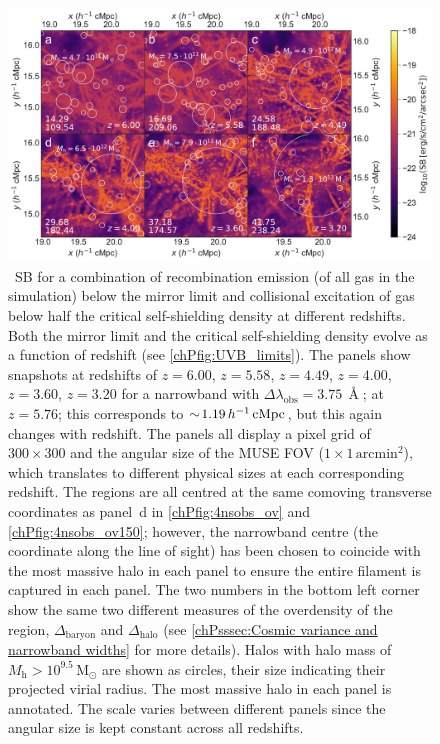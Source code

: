 \begin{figure}
    \centering
    \includegraphics[width=\linewidth]{"Plots/ChapterP/Redshift_SB_evolution"}
    \caption[Observed \lya\ surface brightness at different redshifts]
    {\lya\ SB for a combination of recombination emission (of all gas in the simulation) below the mirror limit and collisional excitation of gas below half the critical self-shielding density at different redshifts. Both the mirror limit and the critical self-shielding density evolve as a function of redshift (see \cref{chPfig:UVB_limits}). The panels show snapshots at redshifts of $z=6.00$, $z=5.58$, $z=4.49$, $z=4.00$, $z=3.60$, $z=3.20$ for a narrowband with $\Delta \lambda_\text{obs} = 3.75 \, \Angstrom$; at $z=5.76$; this corresponds to $\sim \! 1.19 \, h^{-1} \, \mathrm{cMpc}$, but this again changes with redshift. The panels all display a pixel grid of $300 \times 300$ and the angular size of the MUSE FOV ($1 \times 1 \, \mathrm{arcmin}^2$), which translates to different physical sizes at each corresponding redshift. The regions are all centred at the same comoving transverse coordinates as panel~d in \cref{chPfig:4nsobs_ov} and \cref{chPfig:4nsobs_ov150}; however, the narrowband centre (the coordinate along the line of sight) has been chosen to coincide with the most massive halo in each panel to ensure the entire filament is captured in each panel. The two numbers in the bottom left corner show the same two different measures of the overdensity of the region, $\Delta_\mathrm{baryon}$ and $\Delta_\mathrm{halo}$ (see \cref{chPsssec:Cosmic variance and narrowband widths} for more details). Halos with halo mass of $M_\mathrm{h} > 10^{9.5} \, \mathrm{M_\odot}$ are shown as circles, their size indicating their projected virial radius. The most massive halo in each panel is annotated. The scale varies between different panels since the angular size is kept constant across all redshifts.}
    \label{appPfig:4nsobs_mos}
\end{figure}

